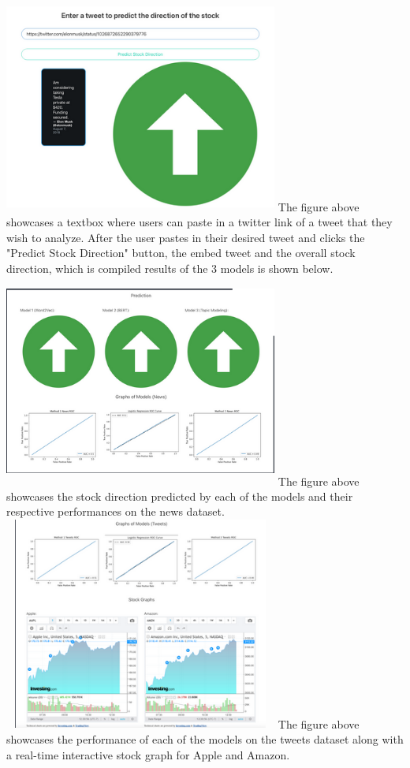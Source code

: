 \documentclass[conference]{IEEEtran}
\begin{document}
\includegraphics[width=9cm, height=7cm]{2.png}
The figure above showcases a textbox where users can paste in a twitter link of a tweet that they wish to analyze. After the user pastes in their desired tweet and clicks the "Predict Stock Direction" button, the embed tweet and the overall stock direction, which is compiled results of the 3 models is shown below. 
\includegraphics[width=9cm, height=7cm]{1.png}
The figure above showcases the stock direction predicted by each of the models and their respective performances on the news dataset.
\includegraphics[width=9cm, height=7cm]{3.png}
The figure above showcases the performance of each of the models on the tweets dataset along with a real-time interactive stock graph for Apple and Amazon.
\end{document}
